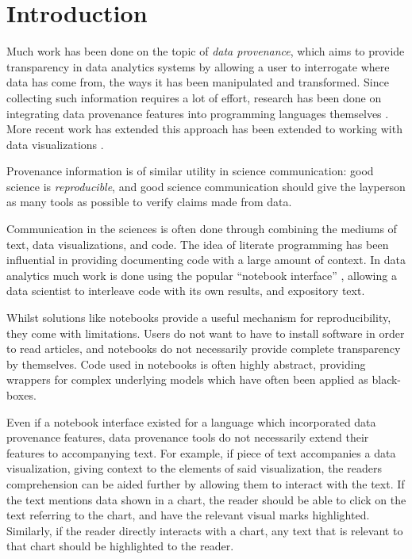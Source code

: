\section{Introduction}

Much work has been done on the topic of \emph{data provenance}, which aims to provide
transparency in data analytics systems by allowing a user to interrogate where data has come
from, the ways it has been manipulated and transformed. Since collecting such information
requires a lot of effort, research has been done on integrating data provenance features
into programming languages themselves \cite{fehrenbach16}. More recent work has
extended this approach has been extended to working with data visualizations \cite{perera22}.

Provenance information is of similar utility in science communication: good science is
\emph{reproducible}, and good science communication should give the layperson as many tools
as possible to verify claims made from data.

Communication in the sciences is often done through combining the mediums of text,
data visualizations, and code. The idea of literate programming \cite{knuth84} has
been influential in providing documenting code with a large amount of context. In data
analytics much work is done using the popular ``notebook interface'' \cite{kluyver16},
allowing a data scientist to interleave code with its own results, and expository text. 

Whilst solutions like notebooks provide a useful 
mechanism for reproducibility, they come with limitations. Users do not want to 
have to install software in order to read articles, and notebooks do not necessarily provide complete
transparency by themselves. Code used in notebooks is often highly abstract, providing wrappers
for complex underlying models which have often been applied as black-boxes.

Even if a notebook interface existed for a language which incorporated data provenance features,
data provenance tools do not necessarily extend their features to accompanying text. For example,
if piece of text accompanies a data visualization, giving context to the elements of said 
visualization, the readers comprehension can be aided further by allowing them to interact
with the text. If the text mentions data shown in a chart, the reader should be able to
click on the text referring to the chart, and have the relevant visual marks highlighted.
Similarly, if the reader directly interacts with a chart, any text that is relevant to that
chart should be highlighted to the reader.

